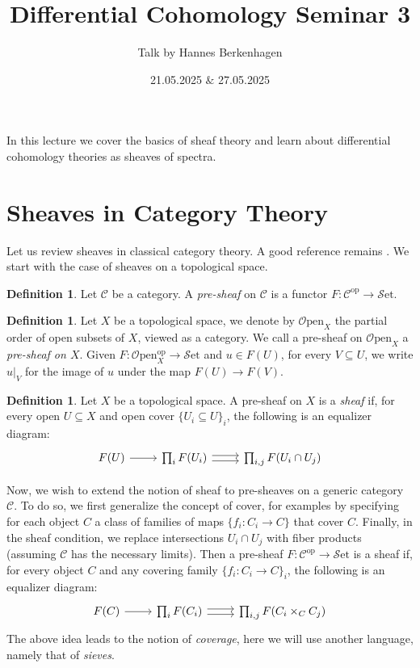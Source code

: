 \documentclass[10pt]{amsart}
\title{Differential Cohomology Seminar 3}
\date{21.05.2025 $\&$ 27.05.2025}
\author{Talk by Hannes Berkenhagen}
\newcommand{\C}{\mathscr{C}}
\newcommand{\set}{\mathscr{S}\mathrm{et}}
\newcommand{\Open}{\mathscr{O}\mathrm{pen}}
\newcommand{\op}{\mathrm{op}}
\theoremstyle{definition}
\newtheorem{definition}[equation]{Definition}
\theoremstyle{remark}
\numberwithin{equation}{section}
\begin{document}
\maketitle

	\maketitle
	
	In this lecture we cover the basics of sheaf theory and learn about differential cohomology theories as sheaves of spectra. 
	
	\section{Sheaves in Category Theory}
	Let us review sheaves in classical category theory. A good reference remains \cite{maclanemoerdijk1994topos}. We start with  the case of sheaves on a topological space. 
	\begin{definition}
		Let $\C$ be a category. A \emph{pre-sheaf} on $\C$ is a functor $F:\C^{\op}\to\set$. 
	\end{definition}
	\begin{definition}
		Let $X$ be a topological space, we denote by $\Open_X$ the partial order of open subsets of $X$, viewed as a category. We call a pre-sheaf on $\Open_X$ a \emph{pre-sheaf on $X$}. Given $F:\Open_X^{\op}\to\set$ and $u\in F(U)$, for every $V\subseteq U$, we write $u|_V$ for the image of $u$ under the map $F(U)\to F(V)$. 
	\end{definition}	
	\begin{definition}
		Let $X$ be a topological space. A pre-sheaf on $X$ is a \emph{sheaf} if, for every open $U\subseteq X$ and open cover $\{U_i\subseteq U\}_i$, the following is an equalizer diagram:
		\[
		\begin{tikzcd}
			F(U) \arrow[r] & \prod_iF(U_i) \arrow[r, shift left=1] \arrow[r, shift right = 1] &   \prod_{i,j} F(U_i \cap U_j) 
		\end{tikzcd}
		\]
	\end{definition}
	Now, we wish to extend the notion of sheaf to pre-sheaves on a generic category $\C$.
	To do so, we first generalize the concept of cover, for examples by specifying for each object $C$ a class of families of maps $\{f_i:C_i\to C\}$ that {cover} $C$. Finally, in the sheaf condition, we replace intersections $U_i\cap U_j$ with fiber products (assuming $\C$ has the necessary limits). Then a pre-sheaf $F:\C^{\op}\to\set$ is a sheaf if, for every object $C$ and any covering family $\{f_i:C_i\to C\}_i$, the following is an equalizer diagram:\[
		\begin{tikzcd}
			F(C) \arrow[r] & \prod_i F(C_i) \arrow[r, shift left=1] \arrow[r, shift right = 1] &   \prod_{i,j} F(C_i \times_C C_j) 
		\end{tikzcd}
		\]
	The above idea leads to the notion of \emph{coverage}, here we will use another language, namely that of \emph{sieves}. 
	
\end{document}
